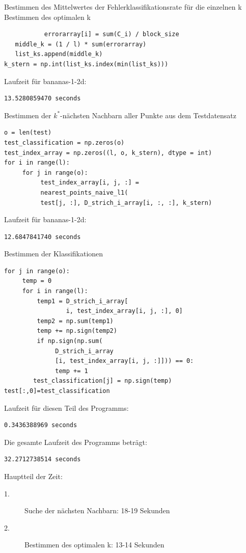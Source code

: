 \documentclass{beamer}
\begin{document}
\begin{frame}[fragile]
Bestimmen des Mittelwertes der Fehlerklassifikationsrate für die einzelnen k\\
Bestimmen des optimalen k
\begin{verbatim}    	   errorarray[i] = sum(C_i) / block_size
   middle_k = (1 / l) * sum(errorarray)
   list_ks.append(middle_k)
k_stern = np.int(list_ks.index(min(list_ks)))
\end{verbatim}
Laufzeit für bananas-1-2d:
\begin{verbatim}
13.5280859470 seconds
\end{verbatim}
\end{frame}

\begin{frame}[fragile]
Bestimmen der $k^*$-nächsten Nachbarn aller Punkte aus dem Testdatensatz
\begin{verbatim}
o = len(test)
test_classification = np.zeros(o)
test_index_array = np.zeros((l, o, k_stern), dtype = int)
for i in range(l):
     for j in range(o):
          test_index_array[i, j, :] =
          nearest_points_naive_l1(
          test[j, :], D_strich_i_array[i, :, :], k_stern)
\end{verbatim}
Laufzeit für bananas-1-2d:
\begin{verbatim}
12.6847841740 seconds
\end{verbatim}
\end{frame}

\begin{frame}[fragile]
Bestimmen der Klassifikationen
\begin{verbatim}
for j in range(o):
     temp = 0
     for i in range(l):
         temp1 = D_strich_i_array[
                 i, test_index_array[i, j, :], 0]
         temp2 = np.sum(temp1)
         temp += np.sign(temp2)
         if np.sign(np.sum(
              D_strich_i_array
              [i, test_index_array[i, j, :]])) == 0:
              temp += 1
        test_classification[j] = np.sign(temp)
test[:,0]=test_classification
\end{verbatim}
\end{frame}

\begin{frame}[fragile]
Laufzeit für diesen Teil des Programms:
\begin{verbatim}
0.3436388969 seconds
\end{verbatim}
Die gesamte Laufzeit des Programms beträgt:
\begin{verbatim}
32.2712738514 seconds
\end{verbatim}
Hauptteil der Zeit:
\begin{description}
\item[1.] Suche der nächsten Nachbarn: 18-19 Sekunden
\item[2.] Bestimmen des optimalen k: 13-14 Sekunden
\end{description}
\end{frame}
\end{document}
